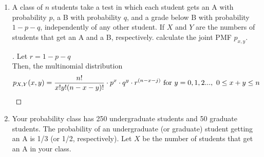 \documentclass[paper=usletter, fontsize=12pt]{article}
\begin{document}
\begin{enumerate}[label=\textbf{\arabic*}.]
        \item
        A class of $n$ students take a test in which each student gets an A
        with probability $p$, a B with probability $q$, and a grade below B
        with probability $1 - p - q$, independently of any other student. If
        $X$ and $Y$ are the numbers of students that get an A and a B,
        respectively. calculate the joint PMF $p_{x,y}$.
        \begin{proof}[\unskip\nopunct]
            Let $r = 1 - p - q$\\
            Then, the multinomial distribution
            \begin{align*}
            p_{X,Y}(x, y) & = \frac{n!}{x!y!(n-x-y)!} \cdot p^x \cdot q^y \cdot r^{(n-x-j)} \text{ for } y=0,1,2..., \ 0 \le x+y \le n \qedhere
            \end{align*}
        \end{proof}
        \vspace{0.2in}

        \item
        Your probability class has 250 undergraduate students and 50 graduate
        students. The probability of an undergraduate (or graduate) student
        getting an A is 1/3 (or 1/2, respectively). Let $X$ be the number of
        students that get an A in your class.
        \begin{enumerate}[label=(\alph*)]


\end{enumerate}
\end{enumerate}
\end{document}
